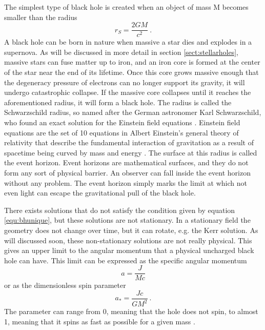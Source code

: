 \documentclass[english, oneside]{HYgradu}
\begin{document}
The simplest type of black hole is created when an object of mass M becomes smaller than the radius
\begin{equation}
r_S = \frac{2GM}{c^2} \ .
\end{equation}
A black hole can be born in nature when massive a star dies and explodes in a supernova. As will be discussed in more detail in section \ref{sect:stellarholes}, massive stars can fuse matter up to iron, and an iron core is formed at the center of the star near the end of its lifetime. Once this core grows massive enough that the degeneracy pressure of electrons can no longer support its gravity, it will undergo catastrophic collapse. If the massive core collapses until it reaches the aforementioned radius, it will form a black hole. The radius is called the Schwarzschild radius, so named after the German astronomer Karl Schwarzschild, who found an exact solution for the Einstein field equations \citep{schwarzschild:1916}. Einstein field equations are the set of 10 equations in Albert Einstein's general theory of relativity that describe the fundamental interaction of gravitation as a result of spacetime being curved by mass and energy \citep{einstein:1915}. The surface at this radius is called the event horizon. Event horizons are mathematical surfaces, and they do not form any sort of physical barrier. An observer can fall inside the event horizon without any problem. The event horizon simply marks the limit at which not even light can escape the gravitational pull of the black hole.

There exists solutions that do not satisfy the condition given by equation \ref{equ:bhunique}, but these solutions are not stationary. In a stationary field the geometry does not change over time, but it can rotate, e.g. the Kerr solution. As will discussed soon, these non-stationary solutions are not really physical. This gives an upper limit to the angular momentum that a physical uncharged black hole can have. This limit can be expressed as the specific angular momentum 
\begin{equation} \label{equ:angularmomentum}
a = \frac{J}{Mc}
\end{equation}
or as the dimensionless spin parameter
\begin{equation}
a_* = \frac{Jc}{GM^2} \ .
\end{equation}
The parameter can range from 0, meaning that the hole does not spin, to almost 1, meaning that it spins as fast as possible for a given mass \citep{middleton:2016}.
\end{document}
